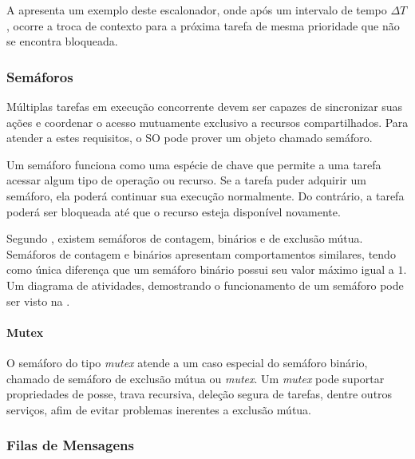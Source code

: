 A  apresenta um exemplo deste escalonador, onde após um intervalo de tempo $\Delta T$, ocorre a troca de contexto para a próxima tarefa de mesma prioridade que não se encontra bloqueada.


\subsubsection{Semáforos}

Múltiplas tarefas em execução concorrente devem ser capazes de sincronizar suas ações e coordenar o acesso mutuamente exclusivo a recursos compartilhados. Para atender a estes requisitos, o SO pode prover um objeto chamado semáforo.

Um semáforo funciona como uma espécie de chave que permite a uma tarefa acessar algum tipo de operação ou recurso. Se a tarefa puder adquirir um semáforo, ela poderá continuar sua execução normalmente. Do contrário, a tarefa poderá ser bloqueada até que o recurso esteja disponível novamente.

Segundo , existem semáforos de contagem, binários e de exclusão mútua. Semáforos de contagem e binários apresentam comportamentos similares, tendo como única diferença que um semáforo binário possui seu valor máximo igual a $1$. Um diagrama de atividades, demostrando o funcionamento de um semáforo pode ser visto na .


\paragraph{Mutex}

O semáforo do tipo \emph{mutex} atende a um caso especial do semáforo binário, chamado de semáforo de exclusão mútua ou \emph{mutex}. Um \emph{mutex} pode suportar propriedades de posse, trava recursiva, deleção segura de tarefas, dentre outros serviços, afim de evitar problemas inerentes a exclusão mútua.

\subsubsection{Filas de Mensagens}


